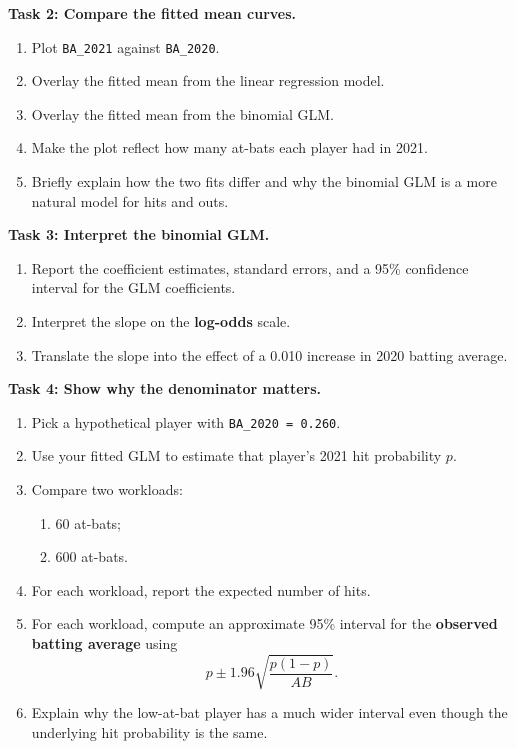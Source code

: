 \documentclass[twoside]{article}
\theoremstyle{definition}
\begin{document}
\textbf{Task 2: Compare the fitted mean curves.}
\begin{enumerate}
    \item[-] Plot \texttt{BA\_2021} against \texttt{BA\_2020}.
    \item[-] Overlay the fitted mean from the linear regression model.
    \item[-] Overlay the fitted mean from the binomial GLM.
    \item[-] Make the plot reflect how many at-bats each player had in 2021.
    \item[-] Briefly explain how the two fits differ and why the binomial GLM is a more natural model for hits and outs.
\end{enumerate}

\textbf{Task 3: Interpret the binomial GLM.}
\begin{enumerate}
    \item[-] Report the coefficient estimates, standard errors, and a 95\% confidence interval for the GLM coefficients.
    \item[-] Interpret the slope on the \textbf{log-odds} scale.
    \item[-] Translate the slope into the effect of a 0.010 increase in 2020 batting average.
\end{enumerate}

\textbf{Task 4: Show why the denominator matters.}
\begin{enumerate}
    \item[-] Pick a hypothetical player with \texttt{BA\_2020 = 0.260}.
    \item[-] Use your fitted GLM to estimate that player's 2021 hit probability \(p\).
    \item[-] Compare two workloads:
    \begin{enumerate}
        \item 60 at-bats;
        \item 600 at-bats.
    \end{enumerate}
    \item[-] For each workload, report the expected number of hits.
    \item[-] For each workload, compute an approximate 95\% interval for the \textbf{observed batting average} using
    \[
        p \pm 1.96\sqrt{\frac{p(1-p)}{AB}}.
    \]
    \item[-] Explain why the low-at-bat player has a much wider interval even though the underlying hit probability is the same.
\end{enumerate}
\end{document}
